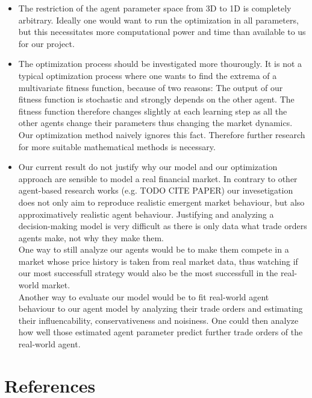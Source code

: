 \documentclass[11pt]{article}
\begin{document}
\begin{itemize}
  \item The restriction of the agent parameter space from 3D to 1D is completely arbitrary. Ideally one would want to run the optimization in all parameters, but this necessitates more computational power and time than available to us for our project.
  \item The optimization process should be investigated more thourougly. It is not a typical optimization process where one wants to find the extrema of a multivariate fitness function, because of two reasons: The output of our fitness function is stochastic and strongly depends on the other agent. The fitness function therefore changes slightly at each learning step as all the other agents change their parameters thus changing the market dynamics. Our optimization method naively ignores this fact. Therefore further research for more suitable mathematical methods is necessary.
  \item Our current result do not justify why our model and our optimization approach are sensible to model a real financial market. In contrary to other agent-based research works (e.g. TODO CITE PAPER) our invesetigation does not only aim to reproduce realistic emergent market behaviour, but also approximatively realistic agent behaviour. Justifying and analyzing a decision-making model is very difficult as there is only data what trade orders agents make, not why they make them. \\
  One way to still analyze our agents would be to make them compete in a market whose price history is taken from real market data, thus watching if our most successfull strategy would also be the most successfull in the real-world market. \\
  Another way to evaluate our model would be to fit real-world agent behaviour to our agent model by analyzing their trade orders and estimating their influencability, conservativeness and noisiness. One could then analyze how well those estimated agent parameter predict further trade orders of the real-world agent.
\end{itemize}


\section{References}


\end{document}
